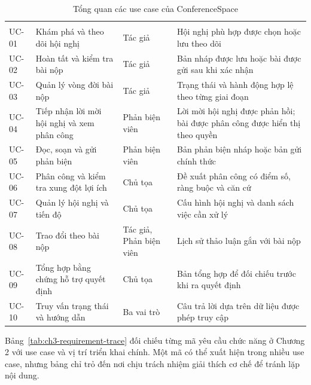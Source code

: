 \begingroup
\setlength{\tabcolsep}{2pt}
\begin{longtable}{|C{0.12\textwidth}|P{0.27\textwidth}|P{0.22\textwidth}|P{0.31\textwidth}|}
  \caption{Tổng quan các use case của ConferenceSpace}\label{tab:ch3-usecase-overview}\\
  \hline
   &  &  &  \\ \hline
  \endfirsthead
  \hline
   &  &  &  \\ \hline
  \endhead
  UC-01 & Khám phá và theo dõi hội nghị & Tác giả & Hội nghị phù hợp được chọn hoặc lưu theo dõi \\ \hline
  UC-02 & Hoàn tất và kiểm tra bài nộp & Tác giả & Bản nháp được lưu hoặc bài được gửi sau khi xác nhận \\ \hline
  UC-03 & Quản lý vòng đời bài nộp & Tác giả & Trạng thái và hành động hợp lệ theo từng giai đoạn \\ \hline
  UC-04 & Tiếp nhận lời mời hội nghị và xem phân công & Phản biện viên & Lời mời hội nghị được phản hồi; bài được phân công được hiển thị theo quyền \\ \hline
  UC-05 & Đọc, soạn và gửi phản biện & Phản biện viên & Bản phản biện nháp hoặc bản gửi chính thức \\ \hline
  UC-06 & Phân công và kiểm tra xung đột lợi ích & Chủ tọa & Đề xuất phân công có điểm số, ràng buộc và căn cứ \\ \hline
  UC-07 & Quản lý hội nghị và tiến độ & Chủ tọa & Cấu hình hội nghị và danh sách việc cần xử lý \\ \hline
  UC-08 & Trao đổi theo bài nộp & Tác giả, Phản biện viên & Lịch sử thảo luận gắn với bài nộp \\ \hline
  UC-09 & Tổng hợp bằng chứng hỗ trợ quyết định & Chủ tọa & Bản tổng hợp để đối chiếu trước khi ra quyết định \\ \hline
  UC-10 & Truy vấn trạng thái và hướng dẫn & Ba vai trò & Câu trả lời dựa trên dữ liệu được phép truy cập \\ \hline
\end{longtable}
\endgroup

Bảng~\ref{tab:ch3-requirement-trace} đối chiếu từng mã yêu cầu chức năng ở Chương 2 với use case và vị trí triển khai chính. Một mã có thể xuất hiện trong nhiều use case, nhưng bảng chỉ trỏ đến nơi chịu trách nhiệm giải thích cơ chế để tránh lặp nội dung.

